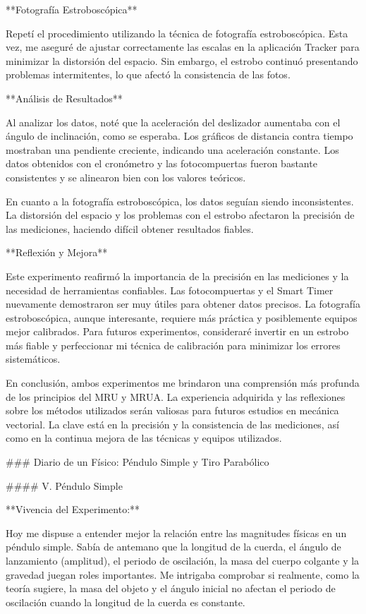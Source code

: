 \documentclass[journal]{IEEEtran}
\begin{document}
**Fotografía Estroboscópica**

Repetí el procedimiento utilizando la técnica de fotografía estroboscópica. Esta vez, me aseguré de ajustar correctamente las escalas en la aplicación Tracker para minimizar la distorsión del espacio. Sin embargo, el estrobo continuó presentando problemas intermitentes, lo que afectó la consistencia de las fotos.

**Análisis de Resultados**

Al analizar los datos, noté que la aceleración del deslizador aumentaba con el ángulo de inclinación, como se esperaba. Los gráficos de distancia contra tiempo mostraban una pendiente creciente, indicando una aceleración constante. Los datos obtenidos con el cronómetro y las fotocompuertas fueron bastante consistentes y se alinearon bien con los valores teóricos.

En cuanto a la fotografía estroboscópica, los datos seguían siendo inconsistentes. La distorsión del espacio y los problemas con el estrobo afectaron la precisión de las mediciones, haciendo difícil obtener resultados fiables.

**Reflexión y Mejora**

Este experimento reafirmó la importancia de la precisión en las mediciones y la necesidad de herramientas confiables. Las fotocompuertas y el Smart Timer nuevamente demostraron ser muy útiles para obtener datos precisos. La fotografía estroboscópica, aunque interesante, requiere más práctica y posiblemente equipos mejor calibrados. Para futuros experimentos, consideraré invertir en un estrobo más fiable y perfeccionar mi técnica de calibración para minimizar los errores sistemáticos.

En conclusión, ambos experimentos me brindaron una comprensión más profunda de los principios del MRU y MRUA. La experiencia adquirida y las reflexiones sobre los métodos utilizados serán valiosas para futuros estudios en mecánica vectorial. La clave está en la precisión y la consistencia de las mediciones, así como en la continua mejora de las técnicas y equipos utilizados.

### Diario de un Físico: Péndulo Simple y Tiro Parabólico

#### V. Péndulo Simple

**Vivencia del Experimento:**

Hoy me dispuse a entender mejor la relación entre las magnitudes físicas en un péndulo simple. Sabía de antemano que la longitud de la cuerda, el ángulo de lanzamiento (amplitud), el periodo de oscilación, la masa del cuerpo colgante y la gravedad juegan roles importantes. Me intrigaba comprobar si realmente, como la teoría sugiere, la masa del objeto y el ángulo inicial no afectan el periodo de oscilación cuando la longitud de la cuerda es constante.
\end{document}
